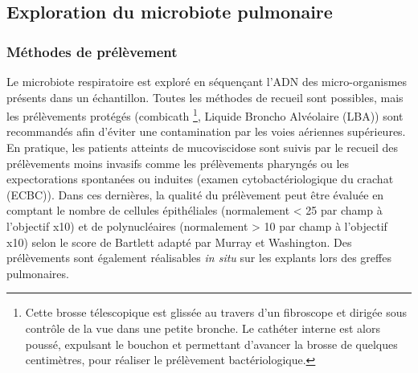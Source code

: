 \documentclass[12pt,a4paper]{article}
\begin{document}
\subsection{Exploration du microbiote pulmonaire}

\subsubsection{Méthodes de prélèvement}
Le microbiote respiratoire est exploré en séquençant l'ADN des micro-organismes présents dans un échantillon.
Toutes les méthodes de recueil sont possibles, mais les prélèvements protégés (combicath \footnote{Cette brosse télescopique est glissée au travers d’un fibroscope et dirigée sous contrôle de la vue dans une petite bronche. Le cathéter interne est alors poussé, expulsant le bouchon et permettant d’avancer la brosse de quelques centimètres, pour réaliser le prélèvement bactériologique.
}, Liquide Broncho Alvéolaire (LBA)) sont recommandés afin
d’éviter une contamination par les voies aériennes supérieures. En pratique, les patients atteints de mucoviscidose sont suivis par le recueil des prélèvements moins invasifs comme les prélèvements pharyngés ou les expectorations spontanées ou induites (examen cytobactériologique du crachat (ECBC)). Dans ces dernières, la qualité du prélèvement peut être évaluée en comptant le nombre de cellules épithéliales (normalement < 25 par champ à l'objectif x10) et de polynucléaires (normalement > 10 par champ à l'objectif x10) selon le score de Bartlett adapté par Murray et Washington\cite{Microbiologie2015}. Des prélèvements sont également réalisables \textit{in situ}  sur les explants lors des greffes pulmonaires.
\end{document}
